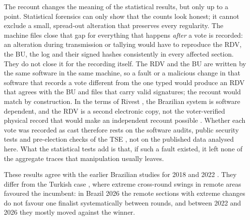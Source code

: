 \documentclass[fleqn,10pt]{SelfArx}
\begin{document}
The recount changes the meaning of the statistical results, but only up to
a point. Statistical forensics can only show that the counts look honest; it
cannot exclude a small, spread-out alteration that preserves every
regularity. The machine files close that gap for everything that happens
\emph{after} a vote is recorded: an alteration during transmission or
tallying would have to reproduce the RDV, the BU, the log and their signed
hashes consistently in every affected section. They do not close it for the
recording itself. The RDV and the BU are written by the same software in the
same machine, so a fault or a malicious change in that software that records
a vote different from the one typed would produce an RDV that agrees with the
BU and files that carry valid signatures; the recount would match by
construction. In the terms of Rivest \cite{rivest2008}, the Brazilian
system is software dependent, and the RDV is a second electronic copy, not
the voter-verified physical record that would make an independent recount
possible \cite{vandegraaf2017}. Whether each vote was recorded as cast
therefore rests on the software audits, public security tests and
pre-election checks of the TSE \cite{aranha2014,aranha2018}, not on the
published data analysed here. What the statistical tests add is that, if
such a fault existed, it left none of the aggregate traces that manipulation
usually leaves.

These results agree with the earlier Brazilian studies for 2018
\cite{figueiredo2022} and 2022 \cite{csh2022}. They differ from the Turkish
case \cite{klimek2023}, where extreme cross-round swings in remote areas
favoured the incumbent: in Brazil 2026 the remote sections with extreme
changes do not favour one finalist systematically between rounds, and
between 2022 and 2026 they mostly moved against the winner.
\end{document}
